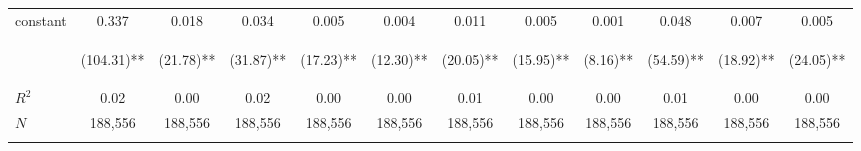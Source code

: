 \begin{tabular}{lccccccccccc}
\noalign{\smallskip}constant & 0.337 & 0.018 & 0.034 & 0.005 & 0.004 & 0.011 & 0.005 & 0.001 & 0.048 & 0.007 & 0.005\\
 & \begin{footnotesize}(104.31)**\end{footnotesize} & \begin{footnotesize}(21.78)**\end{footnotesize} & \begin{footnotesize}(31.87)**\end{footnotesize} & \begin{footnotesize}(17.23)**\end{footnotesize} & \begin{footnotesize}(12.30)**\end{footnotesize} & \begin{footnotesize}(20.05)**\end{footnotesize} & \begin{footnotesize}(15.95)**\end{footnotesize} & \begin{footnotesize}(8.16)**\end{footnotesize} & \begin{footnotesize}(54.59)**\end{footnotesize} & \begin{footnotesize}(18.92)**\end{footnotesize} & \begin{footnotesize}(24.05)**\end{footnotesize}\\
\noalign{\smallskip}$R^2$ & 0.02 & 0.00 & 0.02 & 0.00 & 0.00 & 0.01 & 0.00 & 0.00 & 0.01 & 0.00 & 0.00\\
$N$ & 188,556 & 188,556 & 188,556 & 188,556 & 188,556 & 188,556 & 188,556 & 188,556 & 188,556 & 188,556 & 188,556\\
\noalign{\smallskip}\bottomrule\end{tabular}
